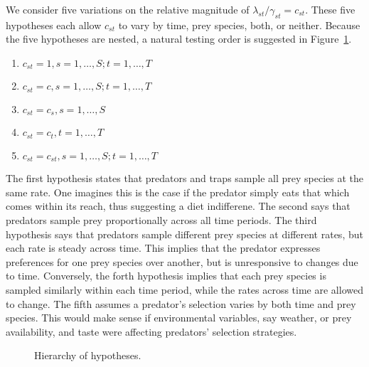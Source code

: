 We consider five variations on the relative magnitude of $\lambda_{st}/\gamma_{st} = c_{st}$.  These five hypotheses each allow $c_{st}$ to vary by time, prey species, both, or neither.  Because the five hypotheses are nested, a natural testing order is suggested in Figure~\ref{fig:hier}.

\begin{enumerate}
\item $c_{st} = 1, s = 1, \ldots, S; t = 1, \ldots, T$
\item $c_{st} = c, s = 1, \ldots, S; t = 1, \ldots, T$
\item $c_{st} = c_s, s = 1, \ldots, S$
\item $c_{st} = c_t, t = 1, \ldots, T$
\item $c_{st} = c_{st}, s = 1, \ldots, S; t = 1, \ldots, T$
\end{enumerate}

The first hypothesis states that predators and traps sample all prey species at the same rate.  One imagines this is the case if the predator simply eats that which comes within its reach, thus suggesting a diet indifferene.  The second says that predators sample prey proportionally across all time periods.  The third hypothesis says that predators sample different prey species at different rates, but each rate is steady across time.  This implies that the predator expresses preferences for one prey species over another, but is unresponsive to changes due to time.  Conversely, the forth hypothesis implies that each prey species is sampled similarly within each time period, while the rates across time are allowed to change.  The fifth assumes a predator's selection varies by both time and prey species.  This would make sense if environmental variables, say weather, or prey availability, and taste were affecting predators' selection strategies.  

\begin{figure}
  \centering
  
  \caption{Hierarchy of hypotheses.}
  \label{fig:hier}
\end{figure}

